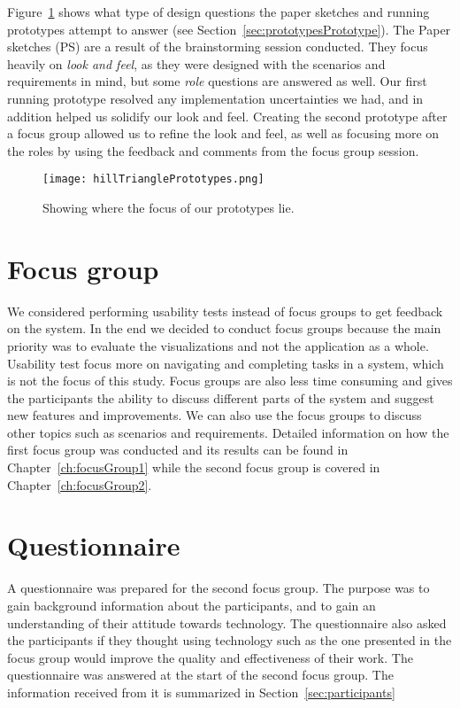 Figure~\ref{fig:hillTrianglePrototypex} shows what type of design questions the paper sketches and running prototypes attempt to answer (see Section~\ref{sec:prototypesPrototype}). The Paper sketches (PS) are a result of the brainstorming session conducted. They focus heavily on \textit{look and feel}, as they were designed with the scenarios and requirements in mind, but some \textit{role} questions are answered as well. Our first running prototype resolved any implementation uncertainties we had, and in addition helped us solidify our look and feel. Creating the second prototype after a focus group allowed us to refine the look and feel, as well as focusing more on the roles by using the feedback and comments from the focus group session.

\begin{figure}[h!]
	\centering
		\texttt{[image: hillTrianglePrototypes.png]}
		\caption{\footnotesize Showing where the focus of our prototypes lie.}
		\label{fig:hillTrianglePrototypex}
\end{figure}

\section{Focus group}
We considered performing usability tests instead of focus groups to get feedback on the system. In the end we decided to conduct focus groups because the main priority was to evaluate the visualizations and not the application as a whole. Usability test focus more on navigating and completing tasks in a system, which is not the focus of this study. Focus groups are also less time consuming and gives the participants the ability to discuss different parts of the system and suggest new features and improvements. We can also use the focus groups to discuss other topics such as scenarios and requirements. Detailed information on how the first focus group was conducted and its results can be found in Chapter~\ref{ch:focusGroup1} while the second focus group is covered in Chapter~\ref{ch:focusGroup2}.

\section{Questionnaire}
A questionnaire was prepared for the second focus group. The purpose was to gain background information about the participants, and to gain an understanding of their attitude towards technology. The questionnaire also asked the participants if they thought using technology such as the one presented in the focus group would improve the quality and effectiveness of their work. The questionnaire was answered at the start of the second focus group. The information received from it is summarized in Section~\ref{sec:participants}
